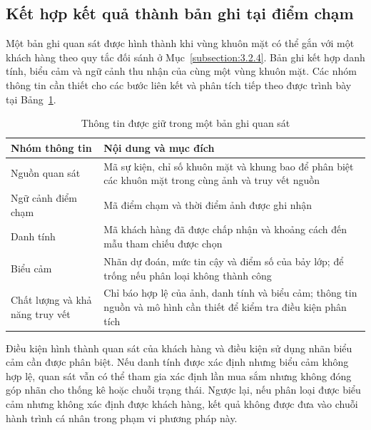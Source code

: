 \documentclass[../LuanVan.tex]{subfiles}
\begin{document}
\subsection{Kết hợp kết quả thành bản ghi tại điểm chạm}
\label{subsection:3.2.5}

Một bản ghi quan sát được hình thành khi vùng khuôn mặt có thể gắn với một khách hàng theo quy tắc đối sánh ở Mục~\ref{subsection:3.2.4}. Bản ghi kết hợp danh tính, biểu cảm và ngữ cảnh thu nhận của cùng một vùng khuôn mặt. Các nhóm thông tin cần thiết cho các bước liên kết và phân tích tiếp theo được trình bày tại Bảng~\ref{tab:observation_fields}.

\begin{table}[htbp]
    \centering
    \caption{Thông tin được giữ trong một bản ghi quan sát}
    \label{tab:observation_fields}
    \small
    \begin{tabular}{|>{\raggedright\arraybackslash}p{4.0cm}|>{\raggedright\arraybackslash}p{9.3cm}|}
        \hline
        \textbf{Nhóm thông tin} & \textbf{Nội dung và mục đích} \\
        \hline
        Nguồn quan sát & Mã sự kiện, chỉ số khuôn mặt và khung bao để phân biệt các khuôn mặt trong cùng ảnh và truy vết nguồn \\
        \hline
        Ngữ cảnh điểm chạm & Mã điểm chạm và thời điểm ảnh được ghi nhận \\
        \hline
        Danh tính & Mã khách hàng đã được chấp nhận và khoảng cách đến mẫu tham chiếu được chọn \\
        \hline
        Biểu cảm & Nhãn dự đoán, mức tin cậy và điểm số của bảy lớp; để trống nếu phân loại không thành công \\
        \hline
        Chất lượng và khả năng truy vết & Chỉ báo hợp lệ của ảnh, danh tính và biểu cảm; thông tin nguồn và mô hình cần thiết để kiểm tra điều kiện phân tích \\
        \hline
    \end{tabular}
\end{table}

Điều kiện hình thành quan sát của khách hàng và điều kiện sử dụng nhãn biểu cảm cần được phân biệt. Nếu danh tính được xác định nhưng biểu cảm không hợp lệ, quan sát vẫn có thể tham gia xác định lần mua sắm nhưng không đóng góp nhãn cho thống kê hoặc chuỗi trạng thái. Ngược lại, nếu phân loại được biểu cảm nhưng không xác định được khách hàng, kết quả không được đưa vào chuỗi hành trình cá nhân trong phạm vi phương pháp này.
\end{document}
